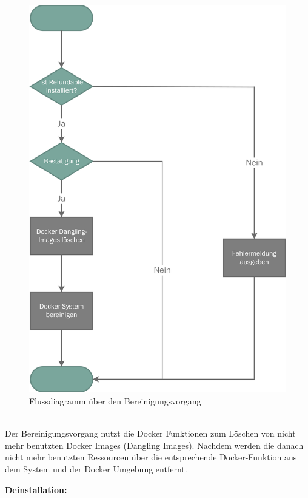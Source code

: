 \begin{figure}[H]
	\centering
	\includegraphics[width=0.55\linewidth]{images/mbeier_konzept/Clean}
	\caption[Flussdiagramm über den Bereinigungsvorgang]{Flussdiagramm über den Bereinigungsvorgang}
	\label{fig:clean}
\end{figure}
~\\
Der Bereinigungsvorgang nutzt die Docker Funktionen zum Löschen von nicht mehr benutzten Docker Images (Dangling Images). Nachdem werden die danach nicht mehr benutzten Ressourcen über die entsprechende Docker-Funktion aus dem System und der Docker Umgebung entfernt.

\newpage

\textbf{Deinstallation:}

